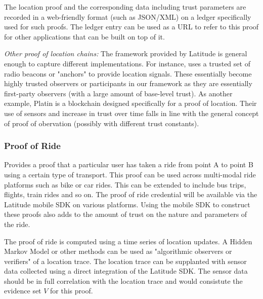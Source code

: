 The location proof and the corresponding data including trust parameters are recorded in a web-friendly format (such as
JSON/XML) on a ledger specifically used for such proofs. The ledger entry can be used as a URL to refer to this proof
for other applications that can be built on top of it.

\noindent
{\em Other proof of location chains:}
The framework provided by Latitude is general enough to capture different implementations. For instance, \cite{foam}
uses a trusted set of radio beacons or "anchors" to provide location signals. These essentially become highly trusted
observers or participants in our framework as they are essentially first-party observers (with a large amount of
base-level trust). As another example, Platin is a blockchain designed specifically for a proof of location. Their use
of sensors and increase in trust over time falls in line with the general concept of proof of obervation (possibly with
different trust constants).

\subsubsection{Proof of Ride}

Provides a proof that a particular user has taken a ride from point A to point B using a
certain type of transport. This proof can be used across multi-modal ride platforms such as bike or car rides.  This can
be extended to include bus trips, flights, train rides and so on. The proof of ride credential will be available via the
Latitude mobile SDK on various platforms. Using the mobile SDK to construct these proofs also adds to the amount of
trust on the nature and parameters of the ride.  

The proof of ride is computed using a time series of location updates. A Hidden Markov Model or other methods
\cite{wu2011} can be used as "algorithmic observers or verifiers" of a location trace. The location trace can be
supplanted with sensor data collected using a direct integration of the Latitude SDK. The sensor data should be in full
correlation with the location trace and would consistute the evidence set $V$ for this proof.

